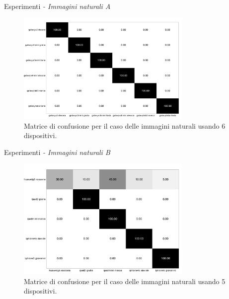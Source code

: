 \begin{tframe}{Esperimenti \emph{- Immagini naturali A}}

\begin{figure}[h]
\begin{center}
\includegraphics[width=0.75\textwidth]{../images/confusionmatrix_nat_6.png}
\end{center}
  \caption{Matrice di confusione per il caso delle immagini naturali usando 6 dispositivi.}
\label{fig:validation}
\end{figure}

\end{tframe}

\begin{tframe}{Esperimenti \emph{- Immagini naturali B}}

\begin{figure}[h]
\begin{center}
\includegraphics[width=0.75\textwidth]{../images/confusionmatrix_nat_5.png}
\end{center}
  \caption{Matrice di confusione per il caso delle immagini naturali usando 5 dispositivi.}
\label{fig:validation}
\end{figure}

\end{tframe}

